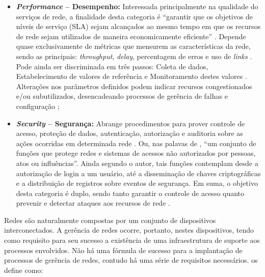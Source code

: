 \documentclass[twoside,english,brazilian]{UNISINOSmonografia}
\begin{document}
\begin{itemize}
		\item \textbf{\textit{Performance} -- Desempenho:}
Interessada principalmente na qualidade do serviços de rede, a finalidade 
desta categoria é ``garantir que os objetivos de níveis de serviço (SLA) sejam 
alcançados ao mesmo tempo em que os recursos de rede sejam utilizados de 
maneira economicamente eficiente'' \cite{Wang2012}.
Depende quase exclusivamente de métricas que mensurem as características da 
rede, sendo as principais: \textit{throughput}, \textit{delay}, percentagem de 
erros e uso de \textit{links} \cite{Clemm2006,Wang2012,Ding2009,Hunt1997}.
Pode ainda ser discriminada em três passos: Coleta de dados, Estabelecimento 
de valores de referência e Monitoramento destes valores \cite{Mauro2009}. 
Alterações nos parâmetros definidos podem indicar recursos congestionados e/ou 
subutilizados, desencadeando processos de gerência de falhas e configuração 
\cite{Wang2012};

		\item \textbf{\textit{Security} -- Segurança:}
Abrange procedimentos para prover controle de acesso, proteção de dados, 
autenticação, autorização e auditoria sobre as ações ocorridas em determinada 
rede \cite{Wang2012}.
Ou, nas palavas de , ``um conjunto de funções que protege 
redes e sistemas de acessos não autorizados por pessoas, atos ou influências''.
Ainda segundo o autor, tais funções contemplam desde a autorização de login a 
um usuário, até a disseminação de chaves criptográficas e a distribuição de 
registros sobre eventos de segurança.
Em suma, o objetivo desta categoria é duplo, sendo tanto garantir o controle 
de acesso quanto prevenir e detectar ataques aos recursos de rede 
\cite{Mauro2009}.

	\end{itemize}

Redes são naturalmente compostas por um conjunto de dispositivos 
interconectados. 
A gerência de redes ocorre, portanto, nestes dispositivos, tendo como 
requisito para seu sucesso a existência de uma infraestrutura de suporte aos 
processos envolvidos.
Não há uma fórmula de sucesso para a implantação de processos de gerência de 
redes, contudo há uma série de requisitos necessários. 
 os define como:
\end{document}
